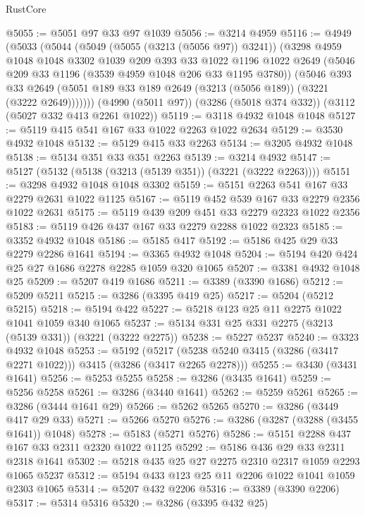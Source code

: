 \begin{lexlean}{RustCore}
\begin{coremodule}
@5055 := @5051 @97 @33 @97 @1039
@5056 := @3214 @4959
@5116 := @4949
    (@5033
      (@5044
        (@5049 (@5055 (@3213 (@5056 @97)) @3241))
        (@3298
          @4959
          @1048
          @1048
          @3302
          @1039
          @209
          @393
          @33
          @1022
          @1196
          @1022
          @2649
          (@5046 @209 @33 @1196 (@3539 @4959 @1048 @206 @33 @1195 @3780))
          (@5046
            @393
            @33
            @2649
            (@5051 @189 @33 @189 @2649 (@3213 (@5056 @189)) (@3221 (@3222 @2649)))))))
    (@4990 (@5011 @97))
    (@3286 (@5018 @374 @332))
    (@3112 (@5027 @332 @413 @2261 @1022))
@5119 := @3118 @4932 @1048 @1048
@5127 := @5119 @415 @541 @167 @33 @1022 @2263 @1022 @2634
@5129 := @3530 @4932 @1048
@5132 := @5129 @415 @33 @2263
@5134 := @3205 @4932 @1048
@5138 := @5134 @351 @33 @351 @2263
@5139 := @3214 @4932
@5147 := @5127 (@5132 (@5138 (@3213 (@5139 @351)) (@3221 (@3222 @2263))))
@5151 := @3298 @4932 @1048 @1048 @3302
@5159 := @5151 @2263 @541 @167 @33 @2279 @2631 @1022 @1125
@5167 := @5119 @452 @539 @167 @33 @2279 @2356 @1022 @2631
@5175 := @5119 @439 @209 @451 @33 @2279 @2323 @1022 @2356
@5183 := @5119 @426 @437 @167 @33 @2279 @2288 @1022 @2323
@5185 := @3352 @4932 @1048
@5186 := @5185 @417
@5192 := @5186 @425 @29 @33 @2279 @2286 @1641
@5194 := @3365 @4932 @1048
@5204 := @5194 @420 @424 @25 @27 @1686 @2278 @2285 @1059 @320 @1065
@5207 := @3381 @4932 @1048 @25
@5209 := @5207 @419 @1686
@5211 := @3389 (@3390 @1686)
@5212 := @5209 @5211
@5215 := @3286 (@3395 @419 @25)
@5217 := @5204 (@5212 @5215)
@5218 := @5194 @422
@5227 := @5218 @123 @25 @11 @2275 @1022 @1041 @1059 @340 @1065
@5237 := @5134 @331 @25 @331 @2275 (@3213 (@5139 @331)) (@3221 (@3222 @2275))
@5238 := @5227 @5237
@5240 := @3323 @4932 @1048
@5253 := @5192
    (@5217 (@5238 @5240 @3415 (@3286 (@3417 @2271 @1022))) @3415 (@3286 (@3417 @2265 @2278)))
@5255 := @3430 (@3431 @1641)
@5256 := @5253 @5255
@5258 := @3286 (@3435 @1641)
@5259 := @5256 @5258
@5261 := @3286 (@3440 @1641)
@5262 := @5259 @5261
@5265 := @3286 (@3444 @1641 @29)
@5266 := @5262 @5265
@5270 := @3286 (@3449 @417 @29 @33)
@5271 := @5266 @5270
@5276 := @3286 (@3287 (@3288 (@3455 @1641)) @1048)
@5278 := @5183 (@5271 @5276)
@5286 := @5151 @2288 @437 @167 @33 @2311 @2320 @1022 @1125
@5292 := @5186 @436 @29 @33 @2311 @2318 @1641
@5302 := @5218 @435 @25 @27 @2275 @2310 @2317 @1059 @2293 @1065 @5237
@5312 := @5194 @433 @123 @25 @11 @2206 @1022 @1041 @1059 @2303 @1065
@5314 := @5207 @432 @2206
@5316 := @3389 (@3390 @2206)
@5317 := @5314 @5316
@5320 := @3286 (@3395 @432 @25)

\end{coremodule}
\end{lexlean}
